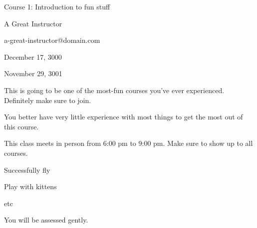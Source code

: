 
Course 1: Introduction to fun stuff

A Great Instructor

a-great-instructor@domain.com

December 17, 3000

November 29, 3001

This is going to be one of the most-fun courses you've ever experienced.
Definitely make sure to join.

You better have very little experience with most things to get the most out of this course.

This class meets in person from 6:00 pm to 9:00 pm. Make sure to show up to all courses.

\item Successfully fly
\item Play with kittens
\item etc

You will be assessed gently.

